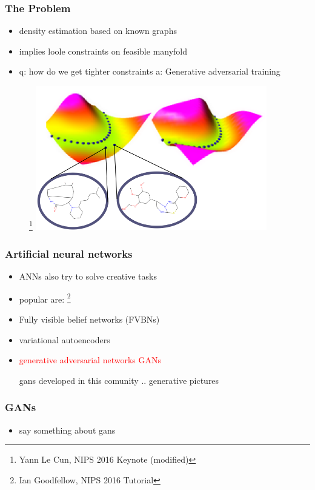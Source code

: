 \documentclass{beamer}
\newcommand{\red}[1]{\textcolor{red}{#1}}
\begin{document}
\begin{frame}
\frametitle{The Problem}
    \begin{itemize}
        \item density estimation based on known graphs
        \item  implies loole constraints on feasible manyfold
        \item q: how do we get tighter constraints
            a: Generative adversarial training
    \end{itemize}
    \begin{figure}[ht]
        \centering
        \footnote{ Yann Le Cun, NIPS 2016 Keynote (modified)}
        \includegraphics[width=0.9\textwidth]{images/valley.png}
    \end{figure}    
\end{frame}



\begin{frame}
\frametitle{Artificial neural networks}
    \begin{itemize}

        \item ANNs also try to solve creative tasks
        \item popular are: \footnote{Ian Goodfellow, NIPS 2016 Tutorial }
        \item Fully visible belief networks (FVBNs)
        \item variational autoencoders
        \item \red{generative adversarial networks GANs}

            gans developed in this comunity .. generative pictures
    \end{itemize}

\frametitle{GANs}
    \begin{itemize}
        \item say something about gans
    \end{itemize}
\end{frame}
\end{document}
